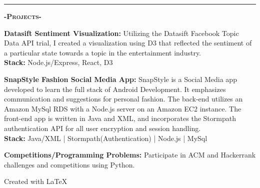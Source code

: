 \documentclass[12pt]{article}
\begin{document}
\noindent\rule{19cm}{0.4pt}

\begin{center}
\textbf{\textsc{-Projects-}}\\
\end{center}
\begin{footnotesize}

\flushleft

\color{Cerulean}\textbf{Datasift Sentiment Visualization:} 
\color{Black}Utilizing the Datasift Facebook Topic Data API trial, I created a visualization using D3 that reflected the sentiment of a particular state towards a topic in the entertainment industry.\\
\smallskip
\setlength\parindent{24pt}\textbf{Stack:} \color{TealBlue} Node.js/Express, React, D3
\bigskip

\flushleft
\color{Cerulean}\textbf{SnapStyle Fashion Social Media App:} 
\color{Black}SnapStyle is a Social Media app developed to learn the full stack of Android Development. It emphasizes communication and suggestions for personal fashion. The back-end utilizes an \color{TealBlue}Amazon MySql RDS \color{Black}with a \color{TealBlue}Node.js \color{Black} server on an \color{TealBlue}Amazon EC2 \color{Black}instance. The front-end app is written in \color{TealBlue}Java and XML, \color{Black} and incorporates the \color{TealBlue}Stormpath \color{Black}authentication API for all user encryption and session handling.\\
\smallskip
\setlength\parindent{24pt}\textbf{Stack:} \color{TealBlue} Java/XML | Stormpath(Authentication) | Node.js | MySql
\bigskip

\setlength\parindent{0pt}
\color{Cerulean}\textbf{Competitions/Programming Problems:}
\color{Black}Participate in ACM and Hackerrank challenges and competitions using \color{TealBlue}Python.\color{Black}

\smallskip

\end{footnotesize}

\center
Created with \LaTeX
\end{document}
